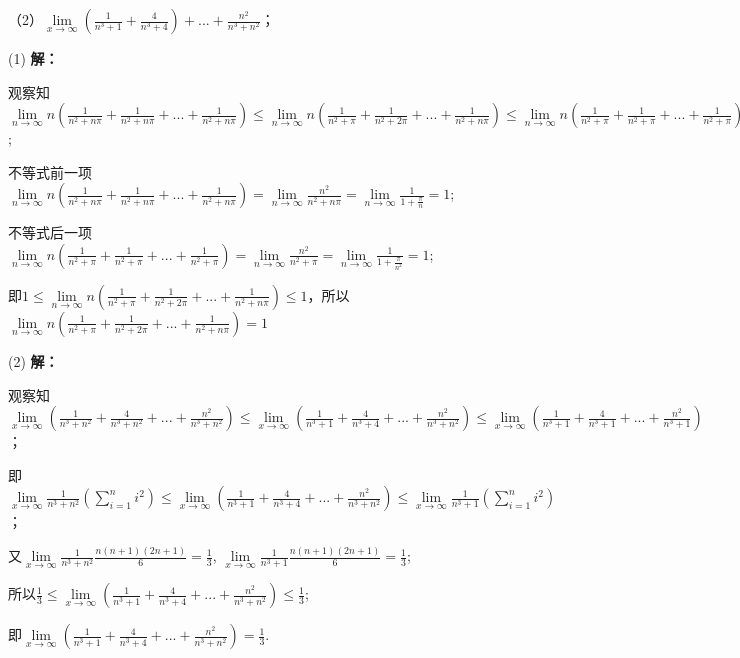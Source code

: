 \documentclass[12pt , a4paper , oneside]{ctexart}
\begin{document}
            （2）$\lim\limits_{x \to \infty}(\frac{1}{n^3 + 1} + \frac{4}{n^3 + 4}) 
            + ... +\frac{n^2}{n^3 + n^2}$；

            \begin{mdframed}
            (1) \textbf{解：}

            观察知$\lim\limits_{n \to \infty} n(\frac{1}{n^2 + n\pi} + \frac{1}{n^2 + n\pi}
            + ... + \frac{1}{n^2 + n\pi}) \leqslant  \lim\limits_{n \to \infty} n(\frac{1}{n^2 + \pi} + \frac{1}{n^2 + 2\pi}
            + ... + \frac{1}{n^2 + n\pi}) \leqslant  \lim\limits_{n \to \infty} n(\frac{1}{n^2 + \pi} + \frac{1}{n^2 + \pi}
            + ... + \frac{1}{n^2 + \pi})$;

            不等式前一项$\lim\limits_{n \to \infty} n(\frac{1}{n^2 + n\pi} + \frac{1}{n^2 + n\pi}
            + ... + \frac{1}{n^2 + n\pi}) = \lim\limits_{n \to \infty} \frac{n^2}{n^2 + n\pi}
            = \lim\limits_{n \to \infty} \frac{1}{1 + \frac{\pi}{n}} = 1$;

            不等式后一项$\lim\limits_{n \to \infty} n(\frac{1}{n^2 + \pi} + \frac{1}{n^2 + \pi}
            + ... + \frac{1}{n^2 + \pi}) = \lim\limits_{n \to \infty} \frac{n^2}{n^2 + \pi}
            = \lim\limits_{n \to \infty} \frac{1}{1 + \frac{\pi}{n^2}} = 1$;

            即$1 \leqslant  \lim\limits_{n \to \infty} n(\frac{1}{n^2 + \pi} + \frac{1}{n^2 + 2\pi}
            + ... + \frac{1}{n^2 + n\pi}) \leqslant  1$，所以$\lim\limits_{n \to \infty} n(\frac{1}{n^2 + \pi} + \frac{1}{n^2 + 2\pi}
            + ... + \frac{1}{n^2 + n\pi}) = 1$
            \end{mdframed}

            \begin{mdframed}
            (2) \textbf{解：}

            观察知$\lim\limits_{x \to \infty}(\frac{1}{n^3 + n^2} + \frac{4}{n^3 + n^2}+...
            + \frac{n^2}{n^3 + n^2}) \leqslant \lim\limits_{x \to \infty}(\frac{1}{n^3 + 1} + 
            \frac{4}{n^3 + 4}+...+ \frac{n^2}{n^3 + n^2})\leqslant \lim\limits_{x \to \infty}(\frac{1}{n^3 + 1} + 
            \frac{4}{n^3 + 1}+...+ \frac{n^2}{n^3 + 1})$；

            即$\lim\limits_{x \to \infty} \frac{1}{n^3 + n^2} (\sum\limits_{i = 1}^{n} i^2) 
            \leqslant \lim\limits_{x \to \infty}(\frac{1}{n^3 + 1} + 
            \frac{4}{n^3 + 4}+...+ \frac{n^2}{n^3 + n^2}) \leqslant \lim\limits_{x \to \infty} \frac{1}{n^3 + 1} (\sum\limits_{i = 1}^{n} i^2) $；
            
            又$\lim\limits_{x \to \infty} \frac{1}{n^3 + n^2} \frac{n(n+1)(2n+1)}{6} = \frac{1}{3}$,
            $\lim\limits_{x \to \infty} \frac{1}{n^3 + 1} \frac{n(n+1)(2n+1)}{6} = \frac{1}{3}$;

            所以$\frac{1}{3} \leqslant \lim\limits_{x \to \infty}(\frac{1}{n^3 + 1} + 
            \frac{4}{n^3 + 4}+...+ \frac{n^2}{n^3 + n^2}) \leqslant \frac{1}{3}$;

            即$\lim\limits_{x \to \infty}(\frac{1}{n^3 + 1} + \frac{4}{n^3 + 4}+...+ \frac{n^2}{n^3 + n^2}) = \frac{1}{3}$.

            \end{mdframed}
\end{document}
